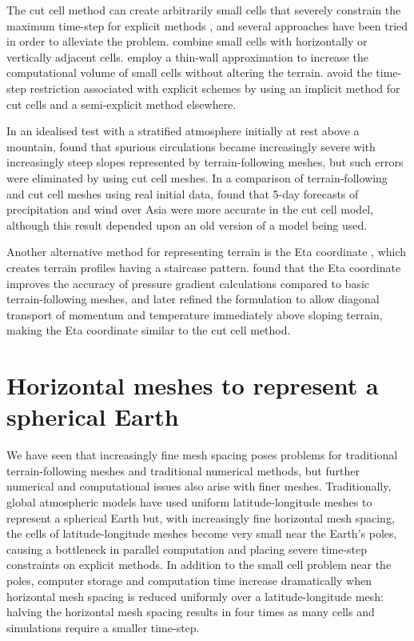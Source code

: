 The cut cell method can create arbitrarily small cells that severely constrain the maximum time-step for explicit methods \citep{klein2009}, and several approaches have been tried in order to alleviate the problem.
\citet{yamazaki-satomura2010} combine small cells with horizontally or vertically adjacent cells.
\citet{steppeler2002} employ a thin-wall approximation to increase the computational volume of small cells without altering the terrain.
\citet{jebens2011} avoid the time-step restriction associated with explicit schemes by using an implicit method for cut cells and a semi-explicit method elsewhere.

In an idealised test with a stratified atmosphere initially at rest above a mountain, \citet{good2014} found that spurious circulations became increasingly severe with increasingly steep slopes represented by terrain-following meshes, but such errors were eliminated by using cut cell meshes.
In a comparison of terrain-following and cut cell meshes using real initial data, \citet{steppeler2013} found that 5-day forecasts of precipitation and wind over Asia were more accurate in the cut cell model, although this result depended upon an old version of a model being used.

Another alternative method for representing terrain is the Eta coordinate \citep{mesinger1988}, which creates terrain profiles having a staircase pattern.
\citet{mesinger1988} found that the Eta coordinate improves the accuracy of pressure gradient calculations compared to basic terrain-following meshes, and \citet{mesinger2012} later refined the formulation to allow diagonal transport of momentum and temperature immediately above sloping terrain, making the Eta coordinate similar to the cut cell method.

\section{Horizontal meshes to represent a spherical Earth}

We have seen that increasingly fine mesh spacing poses problems for traditional terrain-following meshes and traditional numerical methods, but further numerical and computational issues also arise with finer meshes.
Traditionally, global atmospheric models have used uniform latitude-longitude meshes to represent a spherical Earth but, with increasingly fine horizontal mesh spacing, the cells of latitude-longitude meshes become very small near the Earth’s poles, causing a bottleneck in parallel computation \citep{staniforth-thuburn2012} and placing severe time-step constraints on explicit methods.
In addition to the small cell problem near the poles, computer storage and computation time increase dramatically when horizontal mesh spacing is reduced uniformly over a latitude-longitude mesh: halving the horizontal mesh spacing results in four times as many cells and simulations require a smaller time-step.

